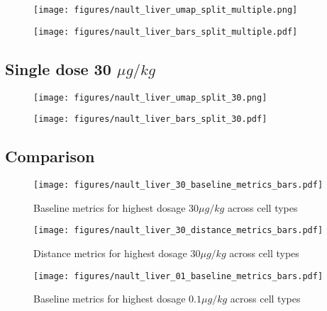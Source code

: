 \begin{figure}[h!]
    \centering
    \texttt{[image: figures/nault\_liver\_umap\_split\_multiple.png]}
\end{figure}

\begin{figure}[h!]
    \centering
    \texttt{[image: figures/nault\_liver\_bars\_split\_multiple.pdf]}
\end{figure}


\subsection{Single dose 30 $\mu g/kg$}

\begin{figure}[h!]
    \centering
    \texttt{[image: figures/nault\_liver\_umap\_split\_30.png]}
\end{figure}

\begin{figure}[h!]
    \centering
    \texttt{[image: figures/nault\_liver\_bars\_split\_30.pdf]}
\end{figure}


\clearpage

\subsection{Comparison}


\begin{figure}[h!]
    \centering
    \texttt{[image: figures/nault\_liver\_30\_baseline\_metrics\_bars.pdf]}
    \caption{Baseline metrics for highest dosage $30 \mu g/kg$ across cell types}
\end{figure}

\begin{figure}[h!]
    \centering
    \texttt{[image: figures/nault\_liver\_30\_distance\_metrics\_bars.pdf]}
    \caption{Distance metrics for highest dosage $30 \mu g/kg$ across cell types}
\end{figure}

\clearpage

\begin{figure}[h!]
    \centering
    \texttt{[image: figures/nault\_liver\_01\_baseline\_metrics\_bars.pdf]}
    \caption{Baseline metrics for highest dosage $0.1 \mu g/kg$ across cell types}
\end{figure}


